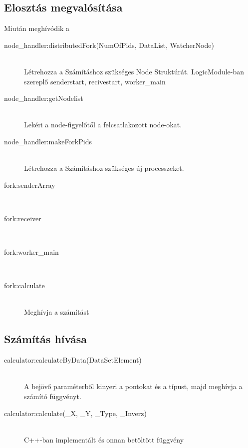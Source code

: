 \subsection{Elosztás megvalósítása}
	Miután meghívódik a 
	\begin{description}
		\item[node\_handler:distributedFork(NumOfPids, DataList, WatcherNode)]
		\hfill \\
		Létrehozza a Számításhoz szükséges Node Struktúrát.
		LogicModule-ban szereplő senderstart, recivestart, worker\_main 
		\item[node\_handler:getNodelist]
		\hfill \\
		Lekéri a node-figyelőtől a felcsatlakozott node-okat.
		\item[node\_handler:makeForkPids]
		\hfill \\
		Létrehozza a Számításhoz szükséges új processzeket.

		\item[fork:senderArray]
		\hfill \\
		\item[fork:receiver]
		\hfill \\
		\item[fork:worker\_main]
		\hfill \\
		\item[fork:calculate]
		\hfill \\ Meghívja a számítást
	\end{description}
\subsection{Számítás hívása}
	\begin{description}
	\item[calculator:calculateByData(DataSetElement)]
	\hfill \\ A bejövő paraméterből kinyeri a pontokat és a típust, majd meghívja a számító függvényt.
	\item[calculator:calculate(\_X, \_Y, \_Type, \_Inverz)]
	\hfill \\ C++-ban implementált és onnan betöltött függvény
	\end{description}
